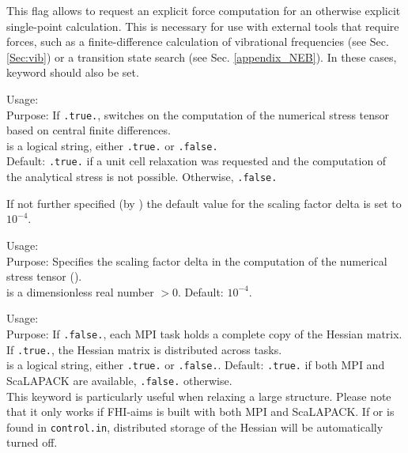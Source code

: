 This flag allows to request an explicit force computation for an
otherwise explicit single-point calculation. This is necessary for use
with external tools that require forces, such as a finite-difference
calculation of vibrational frequencies (see
Sec. \ref{Sec:vib}) or a transition state search (see
Sec. \ref{appendix_NEB}). In these cases, keyword
 should also be set.

{
  \noindent
  Usage:   \\[1.0ex]
  Purpose: If \texttt{.true.}, switches on the computation of
  the numerical stress tensor based on central finite differences. \\[1.0ex] 
   is a logical string, either \texttt{.true.} or
    \texttt{.false.} \\
}
Default: \texttt{.true.} if a unit cell relaxation was requested and the
computation of the analytical stress is not possible. Otherwise,
\texttt{.false.}

If not further specified (by  ) the default
value for the scaling factor delta is set to $10^{-4}$.

{
  \noindent
  Usage:                          \\[1.0ex]
  Purpose: Specifies the scaling factor delta in the computation
           of the numerical stress tensor (). \\[1.0ex] 
   is a dimensionless real number $> 0$. Default: $10^{-4}$.
}

{
  \noindent
  Usage:  \\[1.0ex]
  Purpose:  If \texttt{.false.}, each MPI task holds a complete copy of the
  Hessian matrix.  If \texttt{.true.}, the Hessian matrix is distributed
  across tasks. \\[1.0ex]
   is a logical string, either \texttt{.true.} or
  \texttt{.false.}.  Default: \texttt{.true.} if both MPI and ScaLAPACK are
  available, \texttt{.false.} otherwise.\\
}
This keyword is particularly useful when relaxing a large structure.  Please
note that it only works if FHI-aims is built with both MPI and ScaLAPACK.  If
  or 
 is found in \texttt{control.in}, distributed
storage of the Hessian will be automatically turned off.

